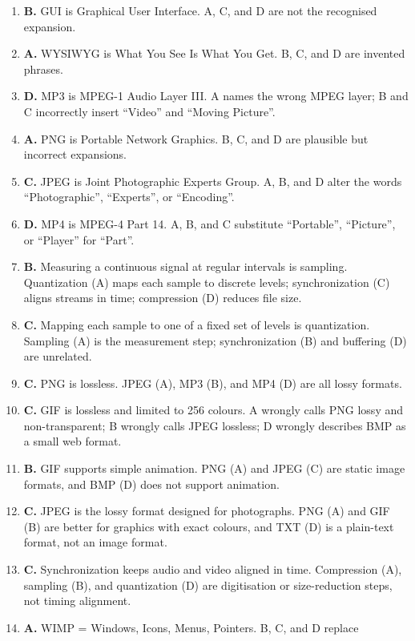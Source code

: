\begin{enumerate}[label=\textbf{Q\arabic*.}, leftmargin=*]
\item \textbf{B.} GUI is Graphical User Interface. A, C, and D are not the
  recognised expansion.
\item \textbf{A.} WYSIWYG is What You See Is What You Get. B, C, and D are
  invented phrases.
\item \textbf{D.} MP3 is MPEG-1 Audio Layer III. A names the wrong MPEG layer;
  B and C incorrectly insert ``Video'' and ``Moving Picture''.
\item \textbf{A.} PNG is Portable Network Graphics. B, C, and D are plausible
  but incorrect expansions.
\item \textbf{C.} JPEG is Joint Photographic Experts Group. A, B, and D alter
  the words ``Photographic'', ``Experts'', or ``Encoding''.
\item \textbf{D.} MP4 is MPEG-4 Part 14. A, B, and C substitute ``Portable'',
  ``Picture'', or ``Player'' for ``Part''.
\item \textbf{B.} Measuring a continuous signal at regular intervals is
  sampling. Quantization (A) maps each sample to discrete levels;
  synchronization (C) aligns streams in time; compression (D) reduces file
  size.
\item \textbf{C.} Mapping each sample to one of a fixed set of levels is
  quantization. Sampling (A) is the measurement step; synchronization (B) and
  buffering (D) are unrelated.
\item \textbf{C.} PNG is lossless. JPEG (A), MP3 (B), and MP4 (D) are all lossy
  formats.
\item \textbf{C.} GIF is lossless and limited to 256 colours. A wrongly calls
  PNG lossy and non-transparent; B wrongly calls JPEG lossless; D wrongly
  describes BMP as a small web format.
\item \textbf{B.} GIF supports simple animation. PNG (A) and JPEG (C) are
  static image formats, and BMP (D) does not support animation.
\item \textbf{C.} JPEG is the lossy format designed for photographs. PNG (A)
  and GIF (B) are better for graphics with exact colours, and TXT (D) is a
  plain-text format, not an image format.
\item \textbf{C.} Synchronization keeps audio and video aligned in time.
  Compression (A), sampling (B), and quantization (D) are digitisation or
  size-reduction steps, not timing alignment.
\item \textbf{A.} WIMP = Windows, Icons, Menus, Pointers. B, C, and D replace

\end{enumerate}
